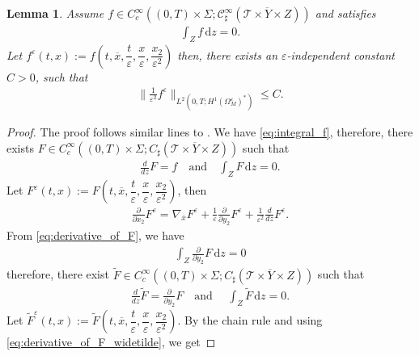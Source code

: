 \documentclass[11pt]{article}
\newtheorem{lemma}{Lemma}
\def\es{\varepsilon}
\def\omm{\Omega_M^\varepsilon}
\def\p{\partial}
\def\T{\mathcal{T}}
\newcommand{\di}[1]{\,\mathrm{d}#1}
\begin{document}
    \begin{lemma}\label{lemma:h-1bound}
    Assume $f\in C_c^{\infty}((0,T)\times\Sigma;\mathcal{C}_{\sharp}^\infty(\overline{\T\times Y\times Z}))$ and satisfies 
    \begin{align}\label{eq:integral_f}
        \int_Z f\di{z}=0.
    \end{align}
    Let $f^\es(t,x):=f\left(t,\overline{x},\dfrac{t}{\es}, \dfrac{x}{\es},\dfrac{x_2}{\es^2}\right)$ then, there exists an $\es$-independent constant $C>0$,  such that
    \begin{align*}
       \| \frac{1}{\es^2} f^\es\|_{L^2(0,T;H^{1}(\omm)^*)}\leq C.
    \end{align*}
\end{lemma}
\begin{proof}
    The proof follows similar lines to \cite[Theorem 3.3]{allaire1996multiscale}. We have \eqref{eq:integral_f}, therefore, there exists $F\in C_c^{\infty}((0,T)\times\Sigma;C_{\sharp}(\overline{\T\times Y\times Z}))$ such that 
    \begin{align}\label{eq:derivative_of_F}
        \frac{d}{dz}F=f\quad\mbox{and}\quad   \int_ZF\di{z}=0.
    \end{align}
    Let $F^\es(t,x):=F\left(t,\overline{x},\dfrac{t}{\es}, \dfrac{x}{\es},\dfrac{x_2}{\es^2}\right)$, then
    \begin{align*}
        \frac{\p}{\p x_2}F^\es=\nabla_{\bar x} F^\es+\frac{1}{\es}\frac{\p}{\p y_2}F^\es+\frac{1}{\es^2}\frac{d}{dz}F^\es.
    \end{align*}
  From \eqref{eq:derivative_of_F}, we have
  \begin{align*}
      \int_Z\frac{\p}{\p y_2}F\di{z}=0
  \end{align*}
    therefore, there exist $\widetilde{F}\in C_c^{\infty}((0,T)\times\Sigma;C_{\sharp}(\overline{\T\times Y\times Z}))$ such that 
    \begin{align}\label{eq:derivative_of_F_widetilde}
        \frac{d}{dz}\widetilde{F}=\frac{\p}{\p y_2}F \quad \mbox{and }\quad    \int_Z\widetilde{F}\di{z}=0.
    \end{align}
     Let $\widetilde{F}^\es(t,x):=\widetilde{F}\left(t,\overline{x},\dfrac{t}{\es}, \dfrac{x}{\es},\dfrac{x_2}{\es^2}\right).$ By the chain rule and using \eqref{eq:derivative_of_F_widetilde}, we get

\end{proof}
\end{document}
